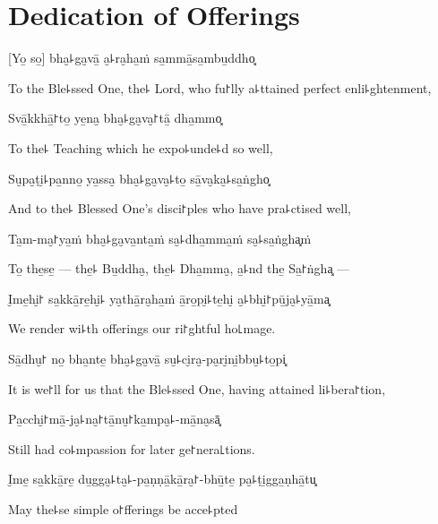 \chapter{Dedication of Offerings}

[Yo̱ so̱] bha̮꜕ga̮vā̱ a̮꜕ra̮ha̱ṁ sa̱mmā̱sa̱mbu̱ddho͓

\begin{english}
To the Ble꜕ssed One, the꜕ Lord, who fu꜓lly a꜕ttained perfect enli꜕ghtenment,
\end{english}

Svā̱kkhā̱꜓to̱ ye̱na̮ bha̮꜕ga̮va̮꜓tā̱ dha̱mmo͓

\begin{english}
To the꜕ Teaching which he expo꜕unde꜕d so well,
\end{english}

Su̮pa̮ṭi̮꜕pa̱nno̱ ya̱ssa̮ bha̮꜕ga̮va̮꜕to̱ sā̱va̮ka̮꜕sa̱ṅgho͓

\begin{english}
And to the꜕ Blessed One's disci꜓ples who have pra꜕ctised well,
\end{english}

Ta̱m-ma̮꜓ya̱ṁ bha̮꜕ga̮va̱nta̱ṁ sa̮꜕dha̱mma̱ṁ sa̮꜕sa̱ṅgha͓ṁ

\begin{english}
To̱ the̱se̱ --- the̱꜕ Bu̱ddha̮, the̱꜕ Dha̱mma̮, a̱꜕nd the̱ Sa̱꜓ṅgha͓ ---
\end{english}

I̮me̱hi̮꜓ sa̱kkā̱re̱hi̮꜕ ya̮thā̱ra̮ha̱ṁ ā̱ro̱pi̮꜕te̱hi̮ a̮꜕bhi̮꜓pū̱ja̮꜕yā̱ma͓

\begin{english}
We render wi꜕th offerings our ri꜓ghtful ho꜖mage.
\end{english}

Sā̱dhu̮꜓ no̱ bha̱nte̱ bha̮꜕ga̮vā̱ su̮꜕ci̮ra̮-pa̮ri̮ni̱bbu̮꜕to̱pi͓

\begin{english}
It is we꜓ll for us that the Ble꜕ssed One, having attained li꜕bera꜓tion,
\end{english}

Pa̱cchi̮꜓mā̱-ja̮꜕na̮꜓tā̱nu̮꜓ka̱mpa̮꜕-mā̱na̮sā͓

\begin{english}
Still had co꜕mpassion for later ge꜓nera꜖tions.
\end{english}

I̮me̱ sa̱kkā̱re̱ du̱gga̮꜕ta̮꜕-pa̱ṇṇā̱kā̱ra̮꜓-bhū̱te̱ pa̮꜕ṭi̱gga̱ṇhā̱tu͓

\begin{english}
May the꜕se simple o꜓fferings be acce꜕pted
\end{english}

